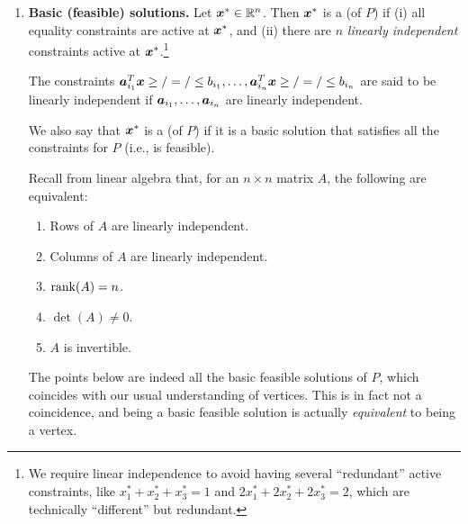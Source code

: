 \begin{enumerate}
\item\label{it:bfs} \textbf{Basic (feasible) solutions.} Let \(\bm{x}^*\in\mathbb{R}^n\). Then
\(\bm{x}^*\) is a  (of \(P\)) if (i) all equality
constraints are active at \(\bm{x}^*\), and (ii) there are \(n\) \emph{linearly
independent} constraints active at \(\bm{x}^*\).\footnote{We require linear
independence to avoid having several ``redundant'' active constraints, like
\(x_1^*+x_2^*+x_3^*=1\) and \(2x_1^*+2x_2^*+2x_3^*=2\), which are technically
``different'' but redundant.}
\begin{note}
The constraints
\(\bm{a}_{i_1}^{T}\bm{x}\ge/=/\le b_{i_1},\dotsc,\bm{a}_{i_n}^{T}\bm{x}\ge/=/\le b_{i_n}\)
are said to be linearly independent if \(\bm{a}_{i_1},\dotsc,\bm{a}_{i_n}\)
are linearly independent.
\end{note}

We also say that \(\bm{x}^*\) is a  (of \(P\))
if it is a basic solution that satisfies all the constraints for \(P\) (i.e.,
is feasible).

\begin{note}
Recall from linear algebra that, for an \(n\times n\) matrix \(A\), the
following are equivalent:
\begin{enumerate}
\item Rows of \(A\) are linearly independent.
\item Columns of \(A\) are linearly independent.
\item \(\operatorname{rank}(A)=n\).
\item \(\det(A)\ne 0\).
\item \(A\) is invertible.
\end{enumerate}
\end{note}

The  points below are indeed all the basic feasible solutions of \(P\),
which coincides with our usual understanding of vertices. This is in fact not a
coincidence, and being a basic feasible solution is actually \emph{equivalent}
to being a vertex.
\begin{center}
\end{center}


\end{enumerate}
